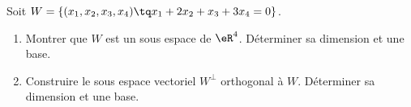 

\begin{exercice}\label{exoINGE1121La0005}

	Soit $W=\{ (x_1,x_2,x_3,x_4)\tq x_1+2x_2+x_3+3x_4=0 \}$.
	\begin{enumerate}

		\item
			Montrer que $W$ est un sous espace de $\eR^4$. Déterminer sa dimension et une base.
		\item
			Construire le sous espace vectoriel $W^{\perp}$ orthogonal à $W$. Déterminer sa dimension et une base.

	\end{enumerate}

\end{exercice}

